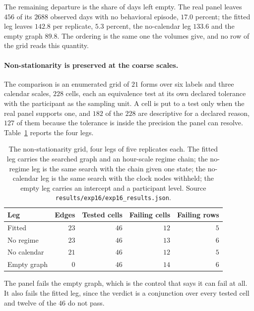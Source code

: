 The remaining departure is the share of days left empty. The real panel leaves
$456$ of its $2688$ observed days with no behavioral episode, $17.0$ percent;
the fitted leg leaves $142.8$ per replicate, $5.3$ percent, the no-calendar leg
$133.6$ and the empty graph $89.8$. The ordering is the same one the volumes
give, and no row of the grid reads this quantity.

\paragraph{Non-stationarity is preserved at the coarse scales.}
The comparison is an enumerated grid of $21$ forms over six labels and three
calendar scales, $228$ cells, each an equivalence test at its own declared
tolerance with the participant as the sampling unit. A cell is put to a test
only when the real panel supports one, and $182$ of the $228$ are descriptive
for a declared reason, $127$ of them because the tolerance is inside the
precision the panel can resolve. Table~\ref{tab:results:arm1_grid} reports the
four legs.

\begin{table}[t]
\centering
\caption{The non-stationarity grid, four legs of five replicates each. The
fitted leg carries the searched graph and an hour-scale regime chain; the
no-regime leg is the same search with the chain given one state; the
no-calendar leg is the same search with the clock nodes withheld; the empty
leg carries an intercept and a participant level. Source
\texttt{results/exp16/exp16\_results.json}.}
\label{tab:results:arm1_grid}
\small
\begin{tabular}{lrrrr}
\toprule
Leg & Edges & Tested cells & Failing cells & Failing rows \\
\midrule
Fitted        & $23$ & $46$ & $12$ & $5$ \\
No regime     & $23$ & $46$ & $13$ & $6$ \\
No calendar   & $21$ & $46$ & $12$ & $5$ \\
Empty graph   & $0$  & $46$ & $14$ & $6$ \\
\bottomrule
\end{tabular}
\end{table}

The panel fails the empty graph, which is the control that says it can fail at
all. It also fails the fitted leg, since the verdict is a conjunction over every
tested cell and twelve of the $46$ do not pass.

